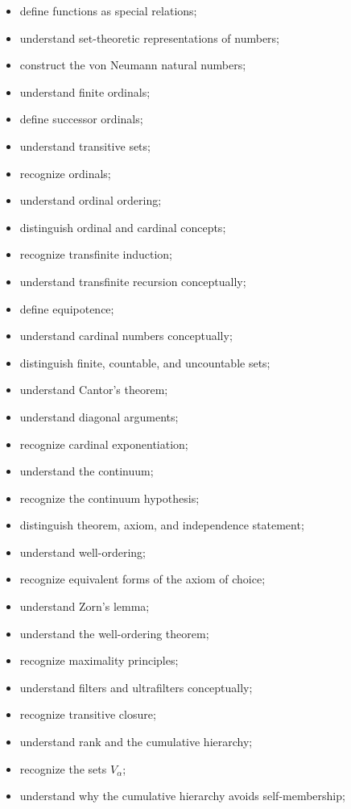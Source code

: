 {\begin{itemize}
    \item define functions as special relations;
    \item understand set-theoretic representations of numbers;
    \item construct the von Neumann natural numbers;
    \item understand finite ordinals;
    \item define successor ordinals;
    \item understand transitive sets;
    \item recognize ordinals;
    \item understand ordinal ordering;
    \item distinguish ordinal and cardinal concepts;
    \item recognize transfinite induction;
    \item understand transfinite recursion conceptually;
    \item define equipotence;
    \item understand cardinal numbers conceptually;
    \item distinguish finite, countable, and uncountable sets;
    \item understand Cantor's theorem;
    \item understand diagonal arguments;
    \item recognize cardinal exponentiation;
    \item understand the continuum;
    \item recognize the continuum hypothesis;
    \item distinguish theorem, axiom, and independence statement;
    \item understand well-ordering;
    \item recognize equivalent forms of the axiom of choice;
    \item understand Zorn's lemma;
    \item understand the well-ordering theorem;
    \item recognize maximality principles;
    \item understand filters and ultrafilters conceptually;
    \item recognize transitive closure;
    \item understand rank and the cumulative hierarchy;
    \item recognize the sets \(V_\alpha\);
    \item understand why the cumulative hierarchy avoids self-membership;

\end{itemize}}
